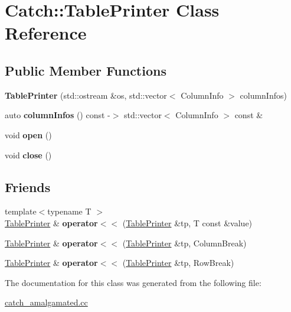 \hypertarget{classCatch_1_1TablePrinter}{}\section{Catch\+:\+:Table\+Printer Class Reference}
\label{classCatch_1_1TablePrinter}
\subsection*{Public Member Functions}
\begin{DoxyCompactItemize}
\item 
\mbox{\label{classCatch_1_1TablePrinter_a5927152ae95eeefa471ab27c01644980}} 
{\bfseries Table\+Printer} (std\+::ostream \&os, std\+::vector$<$ Column\+Info $>$ column\+Infos)
\item 
\mbox{\label{classCatch_1_1TablePrinter_a378f2bdf7f353a13d3a9f683a2c1fa04}} 
auto {\bfseries column\+Infos} () const -\/$>$ std\+::vector$<$ Column\+Info $>$ const \&
\item 
\mbox{\label{classCatch_1_1TablePrinter_abb4f12add189af81ef29694014cac6df}} 
void {\bfseries open} ()
\item 
\mbox{\label{classCatch_1_1TablePrinter_aa5936978a607e853ac0346df60e0f6f7}} 
void {\bfseries close} ()
\end{DoxyCompactItemize}
\subsection*{Friends}
\begin{DoxyCompactItemize}
\item 
\mbox{\label{classCatch_1_1TablePrinter_a78f9037858dee3e7c685f189e645289f}} 
{\footnotesize template$<$typename T $>$ }\\\hyperlink{classCatch_1_1TablePrinter}{Table\+Printer} \& {\bfseries operator$<$$<$} (\hyperlink{classCatch_1_1TablePrinter}{Table\+Printer} \&tp, T const \&value)
\item 
\mbox{\label{classCatch_1_1TablePrinter_aa2ec1ab18690d49a9bf57aea1b0dfdd7}} 
\hyperlink{classCatch_1_1TablePrinter}{Table\+Printer} \& {\bfseries operator$<$$<$} (\hyperlink{classCatch_1_1TablePrinter}{Table\+Printer} \&tp, Column\+Break)
\item 
\mbox{\label{classCatch_1_1TablePrinter_aaab99f8b2c640c880903cc8314925f4d}} 
\hyperlink{classCatch_1_1TablePrinter}{Table\+Printer} \& {\bfseries operator$<$$<$} (\hyperlink{classCatch_1_1TablePrinter}{Table\+Printer} \&tp, Row\+Break)
\end{DoxyCompactItemize}


The documentation for this class was generated from the following file\+:\begin{DoxyCompactItemize}
\item 
\hyperlink{catch__amalgamated_8cc}{catch\+\_\+amalgamated.\+cc}\end{DoxyCompactItemize}
